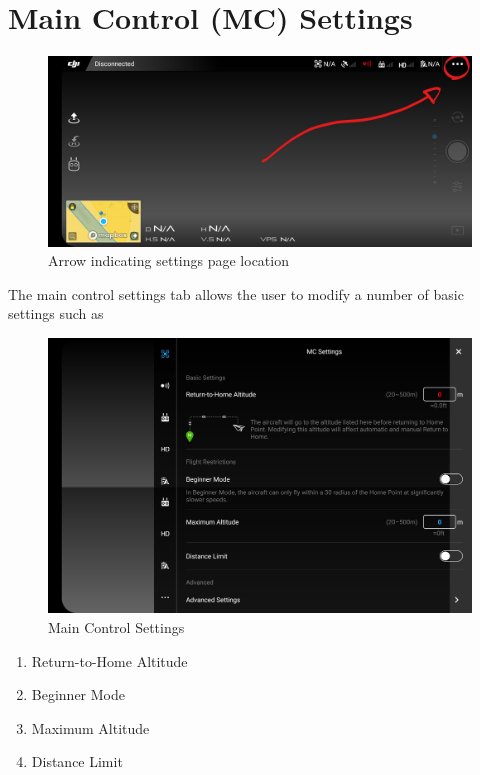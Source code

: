\documentclass[
]{book}
\providecommand{\tightlist}{%
  \setlength{\itemsep}{0pt}\setlength{\parskip}{0pt}}
\begin{document}
\hypertarget{main-control-mc-settings}{%
\section{Main Control (MC) Settings}\label{main-control-mc-settings}}

\begin{figure}
\centering
\includegraphics{images/DJI-SettingsPage.jpg}
\caption{Arrow indicating settings page location}
\end{figure}

The main control settings tab allows the user to modify a number of basic settings such as

\begin{figure}
\centering
\includegraphics{images/MC/DJI-MC-SettingsPage.jpg}
\caption{Main Control Settings}
\end{figure}

\begin{enumerate}
\def\labelenumi{\arabic{enumi}.}
\tightlist
\item
  Return-to-Home Altitude
\item
  Beginner Mode
\item
  Maximum Altitude
\item
  Distance Limit
\end{enumerate}
\end{document}
